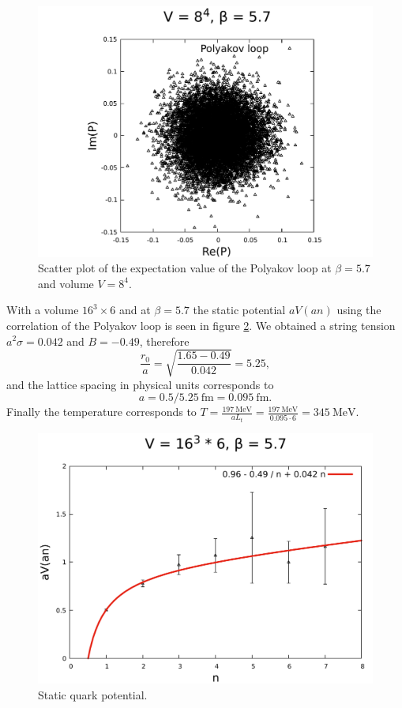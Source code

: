 \documentclass[12pt,a4paper]{article}
\begin{document}
\begin{center}
\begin{figure}
\includegraphics[scale=0.6]{../images/polyakov_loop_beta=57.pdf}
\caption{Scatter plot of the expectation value of the Polyakov loop at $\beta = 5.7$ and volume $V = 8^4$.}
\label{fig:poly2}
\end{figure}
\end{center}


With a volume $16^3 \times 6$ and at $\beta = 5.7$ the static potential $aV(an)$ using the correlation of the Polyakov loop is seen in figure \ref{fig:correlation_polyakov}. We obtained a string tension $a^2\sigma = 0.042$ and $B = -0.49$, therefore
\begin{equation}
	\frac{r_0}{a} = \sqrt{\frac{1.65 - 0.49}{0.042}} = 5.25,
\end{equation}
and the lattice spacing in physical units corresponds to
\begin{equation}
	a = 0.5/ 5.25 \ \text{fm} = 0.095 \ \text{fm}.
\end{equation}
Finally the temperature corresponds to $T = \frac{197 \ \text{MeV}}{aL_t}  = \frac{197\ \text{MeV}}{0.095 \cdot 6} = 345 \ \text{MeV}$.
\begin{figure}
\includegraphics[scale=0.6]{../images/correlation_polyakov.pdf}
\caption{Static quark potential.}
\label{fig:correlation_polyakov}
\end{figure}
\end{document}
